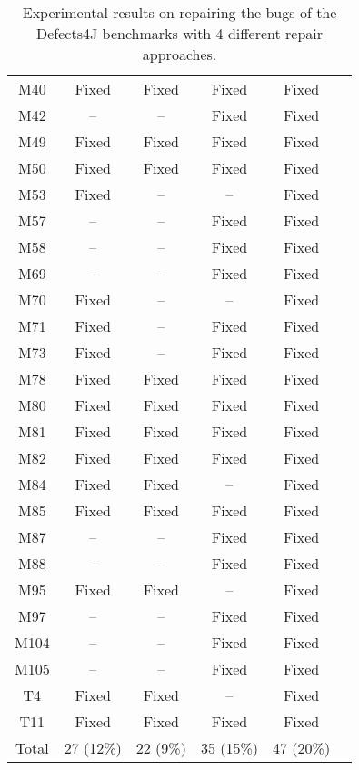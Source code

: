 \begin{table}[!t]
{\begin{tabular}{|c|c|c|c|c|c|}
M40               & Fixed     & Fixed     & Fixed     &Fixed   \\
M42               & --        & --        & Fixed     &Fixed   \\
M49               & Fixed     & Fixed     & Fixed     &Fixed   \\
M50               & Fixed     & Fixed     & Fixed     &Fixed   \\
M53               & Fixed     & --        & --        &Fixed   \\
M57               & --        & --        & Fixed     &Fixed   \\
M58               & --        & --        & Fixed     &Fixed   \\
M69               & --        & --        & Fixed     &Fixed   \\
M70               & Fixed     & --        & --        &Fixed   \\
M71               & Fixed     & --        & Fixed     &Fixed   \\
M73               & Fixed     & --        & Fixed     &Fixed   \\
M78               & Fixed     & Fixed     & Fixed     &Fixed   \\
M80               & Fixed     & Fixed     & Fixed     &Fixed   \\
M81               & Fixed     & Fixed     & Fixed     &Fixed   \\
M82               & Fixed     & Fixed     & Fixed     &Fixed   \\
M84               & Fixed     & Fixed     & --        &Fixed   \\
M85               & Fixed     & Fixed     & Fixed     &Fixed   \\
M87               & --        & --        & Fixed     &Fixed   \\
M88               & --        & --        & Fixed     &Fixed   \\
M95               & Fixed     & Fixed     & --        &Fixed   \\
M97               & --        & --        & Fixed     &Fixed   \\
M104              & --        & --        & Fixed     &Fixed   \\
M105              & --        & --        & Fixed     &Fixed   \\
\hline
T4                & Fixed     & Fixed     & --        &Fixed   \\
T11               & Fixed     & Fixed     & Fixed     &Fixed   \\
\hline
Total             & 27 (12\%) & 22 (9\%)  & 35 (15\%) & 47 (20\%)\\
\hline 
\end{tabular}%
}
\caption{Experimental results on repairing the bugs of the Defects4J benchmarks with 4 different repair approaches.}
\end{table}

